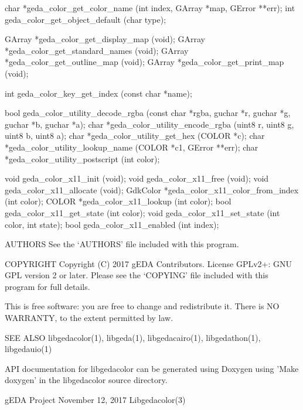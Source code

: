                        char    *geda_color_get_color_name        (int   index,
              GArray *map, GError **err);
                        int    geda_color_get_object_default   (char type);

                     GArray   *geda_color_get_display_map      (void);
                     GArray   *geda_color_get_standard_names   (void);
                     GArray   *geda_color_get_outline_map      (void);
                     GArray   *geda_color_get_print_map        (void);

                        int      geda_color_key_get_index         (const  char
              *name);

                       bool     geda_color_utility_decode_rgba   (const   char
              *rgba, guchar *r, guchar *g, guchar *b, guchar *a);
                       char   *geda_color_utility_encode_rgba  (uint8 r, uint8
              g, uint8 b, uint8 a);
                       char   *geda_color_utility_get_hex      (COLOR *c);
                       char    *geda_color_utility_lookup_name   (COLOR   *c1,
              GError **err);
                       char   *geda_color_utility_postscript   (int color);

                       void    geda_color_x11_init             (void);
                       void    geda_color_x11_free             (void);
                       void    geda_color_x11_allocate         (void);
                   GdkColor   *geda_color_x11_color_from_index (int color);
                      COLOR   *geda_color_x11_lookup           (int color);
                       bool    geda_color_x11_get_state        (int color);
                       void    geda_color_x11_set_state        (int color, int
              state);
                       bool    geda_color_x11_enabled          (int index);


AUTHORS
       See the `AUTHORS' file included with this program.


COPYRIGHT
       Copyright (C) 2017 gEDA Contributors. License GPLv2+: GNU GPL
       version 2 or later. Please see the `COPYING' file included with this
       program for full details.

       This is free software: you are free to change and redistribute it.
       There is NO WARRANTY, to the extent permitted by law.


SEE ALSO
       libgedacolor(1),    libgeda(1),    libgedacairo(1),     libgedathon(1),
       libgedauio(1)

       API documentation for libgedacolor can be generated using Doxygen using
       'Make doxygen' in the libgedacolor source directory.



gEDA Project                   November 12, 2017               Libgedacolor(3)
